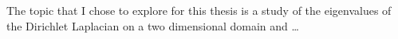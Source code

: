 \documentclass[12pt]{report}
\numberwithin{definition}{section}
\begin{document}
  The topic that I chose to explore for this thesis is a study of the eigenvalues of the Dirichlet Laplacian on a two dimensional domain and \ldots
  
\break
\end{document}
